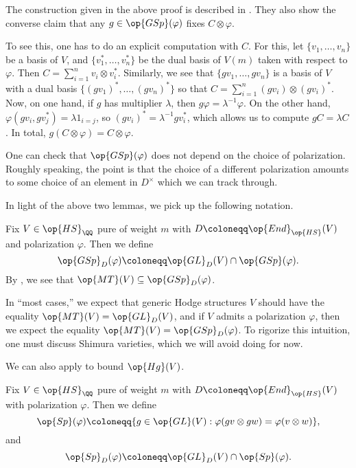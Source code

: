 \documentclass[../thesis.tex]{subfiles}
\begin{document}
\begin{remark}
	The construction given in the above proof is described in \cite[Remark~8.3.4]{ggl-fermat}. They also show the converse claim that any $g\in\op{GSp}(\varphi)$ fixes $C\otimes\varphi$.
	
	To see this, one has to do an explicit computation with $C$. For this, let $\{v_1,\ldots,v_n\}$ be a basis of $V$, and $\{v_1^*,\ldots,v_n^*\}$ be the dual basis of $V(m)$ taken with respect to $\varphi$. Then $C=\sum_{i=1}^nv_i\otimes v_i^*$. Similarly, we see that $\{gv_1,\ldots,gv_n\}$ is a basis of $V$ with a dual basis $\{(gv_1)^*,\ldots,(gv_n)^*\}$ so that $C=\sum_{i=1}^n(gv_i)\otimes(gv_i)^*$. Now, on one hand, if $g$ has multiplier $\lambda$, then $g\varphi=\lambda^{-1}\varphi$. On the other hand, $\varphi(gv_i,gv_j^*)=\lambda1_{i=j}$, so $(gv_i)^*=\lambda^{-1}gv_i^*$, which allows us to compute $gC=\lambda C$. In total, $g(C\otimes\varphi)=C\otimes\varphi$.
\end{remark}
\begin{remark}
	One can check that $\op{GSp}(\varphi)$ does not depend on the choice of polarization. Roughly speaking, the point is that the choice of a different polarization amounts to some choice of an element in $D^\times$ which we can track through.%
\end{remark}
In light of the above two lemmas, we pick up the following notation.
\begin{notation}
	Fix $V\in\op{HS}_\QQ$ pure of weight $m$ with $D\coloneqq\op{End}_{\op{HS}}(V)$ and polarization $\varphi$. Then we define
	\[\op{GSp}_D(\varphi)\coloneqq\op{GL}_D(V)\cap\op{GSp}(\varphi).\]
	By , we see that $\op{MT}(V)\subseteq\op{GSp}_D(\varphi)$.
\end{notation}
\begin{remark} \label{rem:generic-mt}
	In ``most cases,'' we expect that generic Hodge structures $V$ should have the equality $\op{MT}(V)=\op{GL}_D(V)$, and if $V$ admits a polarization $\varphi$, then we expect the equality $\op{MT}(V)=\op{GSp}_D(\varphi)$. To rigorize this intuition, one must discuss Shimura varieties, which we will avoid doing for now.
\end{remark}
We can also apply  to bound $\op{Hg}(V)$.
\begin{notation}
	Fix $V\in\op{HS}_\QQ$ pure of weight $m$ with $D\coloneqq\op{End}_{\op{HS}}(V)$ with polarization $\varphi$. Then we define
	\[\op{Sp}(\varphi)\coloneqq\{g\in\op{GL}(V):\varphi(gv\otimes gw)=\varphi(v\otimes w)\},\]
	and
	\[\op{Sp}_D(\varphi)\coloneqq\op{GL}_D(V)\cap\op{Sp}(\varphi).\]
\end{notation}
\end{document}
